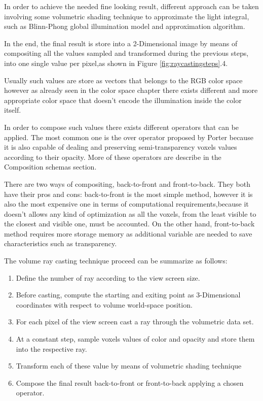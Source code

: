 \documentclass[12pt,a4paper]{extarticle}
\newcommand{\linespace}{\vspace{8pt}}
\begin{document}
In order to achieve the needed fine looking result, different approach can be taken involving some volumetric shading technique to approximate the light integral, such as Blinn-Phong global illumination model and approximation algorithm.
\linespace

In the end, the final result is store into a 2-Dimensional image by means of compositing all the values sampled and transformed during the previous steps, into one single value per pixel,as shown in Figure \ref{fig:raycastingsteps}.4.

Usually such values are store as vectors that belongs to the RGB color space%
however as already seen in the color space chapter there exists different and more appropriate color space that doesn't encode the illumination inside the color itself.
\linespace

In order to compose such values there exists different operators that can be applied. The most common one is the over operator proposed by Porter%
because it is also capable of dealing and preserving semi-transparency voxels values according to their opacity. More of these operators are describe in the Composition schemas section.
\linespace

There are two ways of compositing, back-to-front and front-to-back. They both have their pros and cons: back-to-front is the most simple method, however it is also the most expensive one in terms of computational requirements,because it doesn't allows any kind of optimization as all the voxels, from the least visible to the closest and visible one, must be accounted.
On the other hand, front-to-back method requires more storage memory as additional variable are needed to save characteristics such as transparency.
\linespace

The volume ray casting technique proceed can be summarize as follows:
\begin{enumerate}
\item Define the number of ray according to the view screen size.
\item Before casting, compute the starting and exiting point as 3-Dimensional coordinates with respect to volume world-space position.
\item For each pixel of the view screen cast a ray through the volumetric data set.
\item At a constant step, sample voxels values of color and opacity and store them into the respective ray.
\item Transform each of these value by means of volumetric shading technique
\item Compose the final result back-to-front or front-to-back applying a chosen operator.
\end{enumerate}
\end{document}
